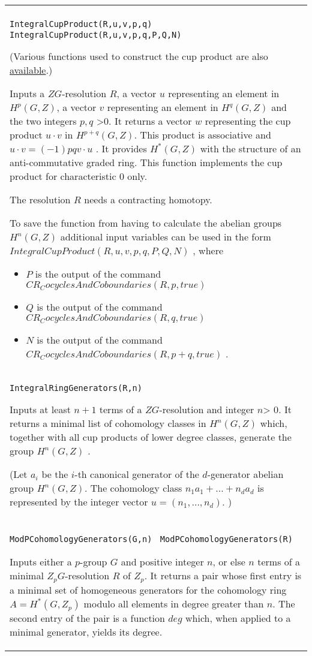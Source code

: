 \documentclass[a4paper,11pt]{report}
\begin{document}
{
 \begin{center}
\begin{tabular}{|l|} \index{IntegralCupProduct} \texttt{IntegralCupProduct(R,u,v,p,q) } \texttt{ IntegralCupProduct(R,u,v,p,q,P,Q,N) } 

 (Various functions used to construct the cup product are also \href{ CR_functions.html} {available}.) 

 Inputs a $ZG$-resolution $R$, a vector $u$ representing an element in $H^p(G,Z)$, a vector $v$ representing an element in $H^q(G,Z)$ and the two integers $p,q$ {\textgreater}$ 0$. It returns a vector $w$ representing the cup product $u\cdot v$ in $H^{p+q}(G,Z)$. This product is associative and $u\cdot v = (-1)pqv\cdot u$ . It provides $H^\ast(G,Z)$ with the structure of an anti-commutative graded ring. This function
implements the cup product for characteristic 0 only. 

 The resolution $R$ needs a contracting homotopy. 

 To save the function from having to calculate the abelian groups $H^n(G,Z)$ additional input variables can be used in the form $IntegralCupProduct(R,u,v,p,q,P,Q,N)$ , where 
\begin{itemize}
\item  $P$ is the output of the command $CR_CocyclesAndCoboundaries(R,p,true)$ 
\item  $Q$ is the output of the command $CR_CocyclesAndCoboundaries(R,q,true)$
\item $N$ is the output of the command $CR_CocyclesAndCoboundaries(R,p+q,true)$ . 
\end{itemize}
 \\
 \index{IntegralRingGenerators} \texttt{IntegralRingGenerators(R,n) } 

 Inputs at least $n+1$ terms of a $ZG$-resolution and integer $n${\textgreater} $0$. It returns a minimal list of cohomology classes in $H^n(G,Z)$ which, together with all cup products of lower degree classes, generate the
group $H^n(G,Z)$ . 

 (Let $a_i$ be the $i$-th canonical generator of the $d$-generator abelian group $H^n(G,Z)$. The cohomology class $n_1a_1 + ... +n_da_d$ is represented by the integer vector $u=(n_1, ..., n_d)$. ) \\
 \index{ModPCohomologyGenerators} \texttt{ModPCohomologyGenerators(G,n) } \texttt{ModPCohomologyGenerators(R) } 

 Inputs either a $p$-group $G$ and positive integer $n$, or else $n$ terms of a minimal $Z_pG$-resolution $R$ of $Z_p$. It returns a pair whose first entry is a minimal set of homogeneous
generators for the cohomology ring $A=H^*(G,Z_p)$ modulo all elements in degree greater than $n$. The second entry of the pair is a function $deg$ which, when applied to a minimal generator, yields its degree. 


\end{tabular}
\end{center}}
\end{document}
